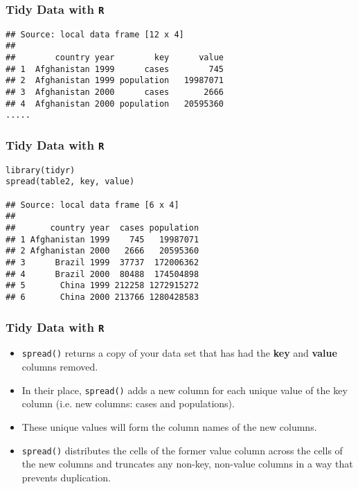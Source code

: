 \documentclass[TIDYMASTER.tex]{subfiles}
\begin{document}
\begin{frame}[fragile]
	\frametitle{Tidy Data with \texttt{R}}
	\large
\begin{verbatim}
## Source: local data frame [12 x 4]
## 
##        country year        key      value
## 1  Afghanistan 1999      cases        745
## 2  Afghanistan 1999 population   19987071
## 3  Afghanistan 2000      cases       2666
## 4  Afghanistan 2000 population   20595360
.....
\end{verbatim}
\end{frame}
\begin{frame}[fragile]
	\frametitle{Tidy Data with \texttt{R}}
	\large
\begin{verbatim}
library(tidyr)
spread(table2, key, value)

## Source: local data frame [6 x 4]
## 
##       country year  cases population
## 1 Afghanistan 1999    745   19987071
## 2 Afghanistan 2000   2666   20595360
## 3      Brazil 1999  37737  172006362
## 4      Brazil 2000  80488  174504898
## 5       China 1999 212258 1272915272
## 6       China 2000 213766 1280428583
\end{verbatim}
\end{frame}
\begin{frame}[fragile]
	\frametitle{Tidy Data with \texttt{R}}
	\Large
\begin{itemize}
\item \texttt{spread()} returns a copy of your data set that has had the \textbf{key} and \textbf{value} columns removed. 
\item In their place, \texttt{spread()} adds a new column for each unique value of the key column (i.e. new columns: cases and populations).
\item These unique values will form the column names of the new columns. 
\item \texttt{spread()} distributes the cells of the former value column across the cells of the new columns and truncates any non-key, non-value columns in a way that prevents duplication.
\end{itemize}


\end{frame}
\end{document}

